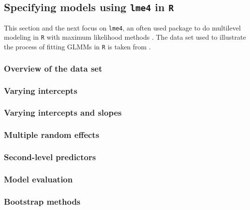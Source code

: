 \subsection{Specifying models using \texttt{lme4} in \texttt{R}}
\label{sec:specifyingmodelsusinglme4inr}

This section and the next focus on \texttt{lme4}, an often used package to do multilevel modeling in \texttt{R} with maximum likelihood methods \citep{BatesEa2015}.
The data set used to illustrate the process of fitting GLMMs in \texttt{R} is taken from \citet{Schaefer2018}.

\subsubsection{Overview of the data set}

\subsubsection{Varying intercepts}

\subsubsection{Varying intercepts and slopes}

\subsubsection{Multiple random effects}

\subsubsection{Second-level predictors}

\subsubsection{Model evaluation}

\subsubsection{Bootstrap methods}

